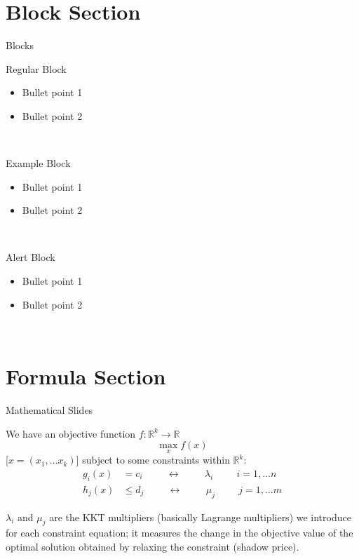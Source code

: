 \documentclass[10pt,aspectratio=169,dvipsnames]{beamer}
\begin{document}
\section{Block Section}
\begin{frame}{Blocks}

\begin{block}{Regular Block}
\begin{itemize}
\item Bullet point 1
\item Bullet point 2
\end{itemize}
~\\
\end{block}

\begin{exampleblock}{Example Block}
\begin{itemize}
\item Bullet point 1
\item Bullet point 2
\end{itemize}
~\\
\end{exampleblock}

\begin{alertblock}{Alert Block}
\begin{itemize}
\item Bullet point 1
\item Bullet point 2
\end{itemize}
~\\

\end{alertblock}

\end{frame}

\section{Formula Section}

\begin{frame}{Mathematical Slides}


We have an \alert{objective function} $f: \mathbb{R}^k \to \mathbb{R}$
\begin{equation*}
  \max_{x} f(x)
\end{equation*}
[$x = (x_1, \dots x_k)$] subject to some \alert{constraints} within $\mathbb{R}^k$:
\begin{align*}
  g_i(x) & = c_i \hspace{1cm}\leftrightarrow\hspace{1cm} \lambda_i \hspace{1cm} i = 1,\dots n \\
  h_j(x) & \leq d_j \hspace{1cm}\leftrightarrow\hspace{1cm} \mu_j \hspace{1cm} j = 1,\dots m
\end{align*}

$\lambda_i$ and $\mu_j$ are the \alert{KKT multipliers} (basically Lagrange multipliers) we introduce for
each constraint equation; it measures the change in the objective value of the optimal solution obtained by relaxing the constraint (shadow price).

\end{frame}
\end{document}
